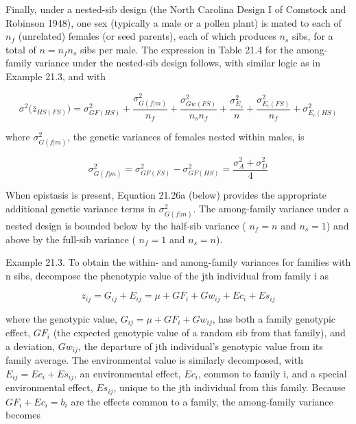 \documentclass{article}
\begin{document}
Finally, under a nested-sib design (the North Carolina Design I of Comstock and Robinson 1948), one sex (typically a male or a pollen plant) is mated to each of  $ n_f $ (unrelated) females (or seed parents), each of which produces  $ n_s $ sibs, for a total of  $ n = n_f n_s $ sibs per male. The expression in Table 21.4 for the among-family variance under the nested-sib design follows, with similar logic as in Example 21.3, and with

\begin{equation}
\sigma^{2}\big(\overline{z}_{H S(F S)}\big)=\sigma_{G F(H S)}^{2}+\frac{\sigma_{G(f|m)}^{2}}{n_{f}}+\frac{\sigma_{G w(F S)}^{2}}{n_{s}n_{f}}+\frac{\sigma_{E_{s}}^{2}}{n}+\frac{\sigma_{E_{c}(F S)}^{2}}{n_{f}}+\sigma_{E_{c}(H S)}^{2}
\tag{21.12a}
\label{eq:21_12a}
\end{equation}

where  $ \sigma_{G(f|m)}^{2} $, the genetic variances of females nested within males, is

\begin{equation}
\sigma_{G(f|m)}^{2}=\sigma_{GF(FS)}^{2}-\sigma_{GF(HS)}^{2}=\frac{\sigma_{A}^{2}+\sigma_{D}^{2}}{4}
\tag{21.12b}
\label{eq:21_12b}
\end{equation}

When epistasis is present, Equation 21.26a (below) provides the appropriate additional genetic variance terms in  $ \sigma_{G(f|m)}^{2} $. The among-family variance under a nested design is bounded below by the half-sib variance ( $ n_{f} = n $ and  $ n_{s} = 1 $) and above by the full-sib variance ( $ n_{f} = 1 $ and  $ n_{s} = n $).

Example 21.3. To obtain the within- and among-family variances for families with n sibs, decompose the phenotypic value of the jth individual from family i as

\begin{equation}
z_{ij}=G_{ij}+E_{ij}=\mu+GF_{i}+Gw_{ij}+Ec_{i}+Es_{ij}
\end{equation}

where the genotypic value,  $ G_{ij} = \mu + GF_i + Gw_{ij} $, has both a family genotypic effect,  $ GF_i $ (the expected genotypic value of a random sib from that family), and a deviation,  $ Gw_{ij} $, the departure of jth individual's genotypic value from its family average. The environmental value is similarly decomposed, with  $ E_{ij} = Ec_i + Es_{ij} $, an environmental effect,  $ Ec_i $, common to family i, and a special environmental effect,  $ Es_{ij} $, unique to the jth individual from this family. Because  $ GF_i + Ec_i = b_i $ are the effects common to a family, the among-family variance becomes
\end{document}
